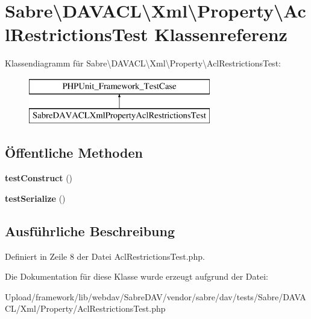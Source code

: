 \hypertarget{class_sabre_1_1_d_a_v_a_c_l_1_1_xml_1_1_property_1_1_acl_restrictions_test}{}\section{Sabre\textbackslash{}D\+A\+V\+A\+CL\textbackslash{}Xml\textbackslash{}Property\textbackslash{}Acl\+Restrictions\+Test Klassenreferenz}
\label{class_sabre_1_1_d_a_v_a_c_l_1_1_xml_1_1_property_1_1_acl_restrictions_test}
Klassendiagramm für Sabre\textbackslash{}D\+A\+V\+A\+CL\textbackslash{}Xml\textbackslash{}Property\textbackslash{}Acl\+Restrictions\+Test\+:\begin{figure}[H]
\begin{center}
\leavevmode
\includegraphics[height=2.000000cm]{class_sabre_1_1_d_a_v_a_c_l_1_1_xml_1_1_property_1_1_acl_restrictions_test}
\end{center}
\end{figure}
\subsection*{Öffentliche Methoden}
\begin{DoxyCompactItemize}
\item 
\mbox{\label{class_sabre_1_1_d_a_v_a_c_l_1_1_xml_1_1_property_1_1_acl_restrictions_test_a0f7602d6ed408e7060026eb76686ed63}} 
{\bfseries test\+Construct} ()
\item 
\mbox{\label{class_sabre_1_1_d_a_v_a_c_l_1_1_xml_1_1_property_1_1_acl_restrictions_test_a2ef301ea7f90e91ffe7cf8a3c4731d7c}} 
{\bfseries test\+Serialize} ()
\end{DoxyCompactItemize}


\subsection{Ausführliche Beschreibung}


Definiert in Zeile 8 der Datei Acl\+Restrictions\+Test.\+php.



Die Dokumentation für diese Klasse wurde erzeugt aufgrund der Datei\+:\begin{DoxyCompactItemize}
\item 
Upload/framework/lib/webdav/\+Sabre\+D\+A\+V/vendor/sabre/dav/tests/\+Sabre/\+D\+A\+V\+A\+C\+L/\+Xml/\+Property/Acl\+Restrictions\+Test.\+php\end{DoxyCompactItemize}
